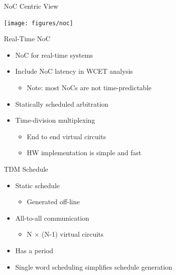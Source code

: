 \documentclass[17pt]{beamer}
\begin{document}
\begin{frame}{NoC Centric View}
  \begin{center}
  \texttt{[image: figures/noc]}    
  \end{center}
\end{frame}

\begin{frame}{Real-Time NoC}
  \begin{itemize}
  \item NoC for real-time systems
  \item Include NoC latency in WCET analysis
    \begin{itemize}
    \item Note: most NoCs are not time-predictable
    \end{itemize}
  \item Statically scheduled arbitration
  \item Time-division multiplexing
    \begin{itemize}
    \item End to end virtual circuits
    \item HW implementation is simple and fast
    \end{itemize}
  \end{itemize}
\end{frame}

\begin{frame}{TDM Schedule}
  \begin{itemize}
  \item Static schedule
    \begin{itemize}
    \item Generated off-line
    \end{itemize}
  \item All-to-all communication
    \begin{itemize}
    \item N $\times$ (N-1) virtual circuits
    \end{itemize}
  \item Has a period
  \item Single word scheduling simplifies schedule generation
  \end{itemize}
\end{frame}
\end{document}
